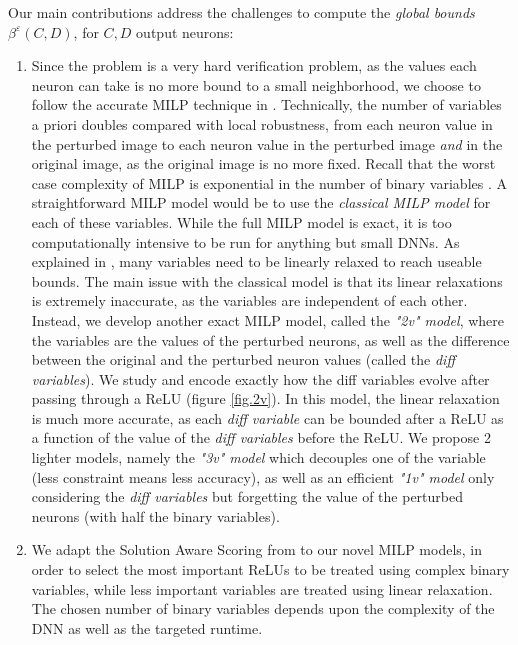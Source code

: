 Our main contributions address the challenges to compute the {\em global bounds} $\beta^\varepsilon(C,D)$, for $C,D$ output neurons:
\begin{enumerate}
	
	\item Since the problem is a very hard verification problem, as the values each neuron can take is no more bound to a small neighborhood, we choose to follow the accurate MILP technique in \cite{ATVA25}. Technically, the number of variables a priori doubles compared with local robustness, from each neuron value in the perturbed image to each neuron value in the perturbed image {\em and} in the original image, as the original image is no more fixed. 
	Recall that the worst case complexity of MILP is exponential in the number of binary variables \cite{DivideAndSlide}. A straightforward MILP model would be to use the {\em classical MILP model} \cite{MILP} for each of these variables. While the full MILP model is exact, it is too computationally intensive to be run for anything but small DNNs. As explained in \cite{ATVA25}, many variables need to be linearly relaxed to reach useable bounds. The main issue with the classical model is that its linear relaxations is extremely inaccurate, as the variables are independent of each other. Instead, we develop another exact MILP model, called the {\em "2v" model}, where the variables are the values of the perturbed neurons, as well as the difference between the original and the perturbed neuron values (called the {\em diff variables}). We study and encode exactly how the diff variables evolve after passing through a ReLU (figure \ref{fig.2v}). In this model, the linear relaxation is much more accurate, as each 
	{\em diff variable} can be bounded 	after a ReLU as a function of the value of the {\em diff variables} before the ReLU. We propose 2 lighter models, namely the {\em "3v" model} which decouples one of the variable (less constraint means less accuracy), as well as an efficient {\em "1v" model} only considering the {\em diff variables} but forgetting the value of the perturbed neurons (with half the binary variables).
	
	\item We adapt the Solution Aware Scoring from \cite{ATVA25} to our novel MILP models, in order to select the most important ReLUs to be treated using complex binary variables, while less important variables are treated using linear relaxation. The chosen number of binary variables depends upon the complexity of the DNN as well as the targeted runtime.


\end{enumerate}
